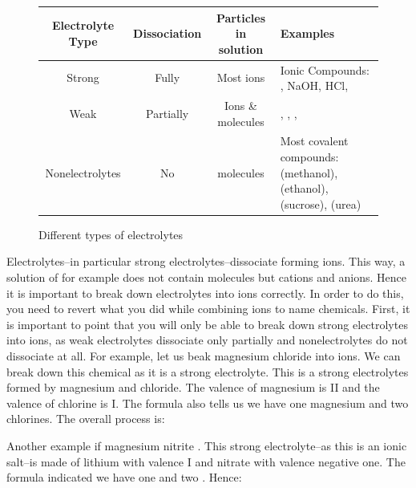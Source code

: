 \documentclass[main.tex]{subfiles}
\begin{document}
\begin{description}
\begin{figure} %
\selectfont
\begin{tabularx}{\linewidth}{c|c|c|L}
\hline
Electrolyte Type        & Dissociation                     & Particles in solution& Examples \\
\hline
Strong     & Fully 								& Most ions & Ionic Compounds: , NaOH, HCl,  \\
\hline
Weak      & Partially                               & Ions \& molecules & , , ,    \\
\hline
Nonelectrolytes    & No           				& molecules &Most covalent compounds: (methanol), (ethanol),  (sucrose), (urea)  \\
\hline
\end{tabularx}
\caption{Different types of electrolytes}
\end{figure}


\item[\docfilehook{Breaking down electrolytes into ions}{}] Electrolytes--in particular strong electrolytes--dissociate forming ions. This way, a solution of for example  does not contain  molecules but  cations and  anions. Hence it is important to break down electrolytes into ions correctly. In order to do this, you need to revert what you did while combining ions to name chemicals. First, it is important to point that you will only be able to break down strong electrolytes into ions, as weak electrolytes dissociate only partially and nonelectrolytes do not dissociate at all.
For example, let us beak magnesium chloride  into ions. We can break down this chemical as it is a strong electrolyte. This is a strong electrolytes formed by magnesium and chloride. The valence of magnesium is II and the valence of chlorine is I. The  formula also tells us we have one magnesium and two chlorines. The overall process is:
\begin{center}\end{center}
Another example if magnesium nitrite . This strong electrolyte--as this is an ionic salt--is made of lithium with valence I and nitrate with valence negative one. The formula indicated we have one  and two . Hence:
\begin{center}\end{center}


\end{description}
\end{document}
